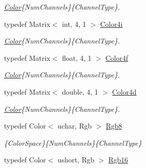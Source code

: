 \begin{DoxyCompactItemize}
\begin{DoxyCompactList}\small\item\em \hyperlink{class_d_o_1_1_color}{Color}\{Num\-Channels\}\{Channel\-Type\}. \end{DoxyCompactList}\item 
\hypertarget{group___color_types_gaaee572369f52480acc39975b3edb55e9}{typedef Matrix$<$ int, 4, 1 $>$ \hyperlink{group___color_types_gaaee572369f52480acc39975b3edb55e9}{Color4i}}\label{group___color_types_gaaee572369f52480acc39975b3edb55e9}

\begin{DoxyCompactList}\small\item\em \hyperlink{class_d_o_1_1_color}{Color}\{Num\-Channels\}\{Channel\-Type\}. \end{DoxyCompactList}\item 
\hypertarget{group___color_types_gaabb5f7b4107bd60e746943a8ca73355b}{typedef Matrix$<$ float, 4, 1 $>$ \hyperlink{group___color_types_gaabb5f7b4107bd60e746943a8ca73355b}{Color4f}}\label{group___color_types_gaabb5f7b4107bd60e746943a8ca73355b}

\begin{DoxyCompactList}\small\item\em \hyperlink{class_d_o_1_1_color}{Color}\{Num\-Channels\}\{Channel\-Type\}. \end{DoxyCompactList}\item 
\hypertarget{group___color_types_gad40abe643d03e7a5f11bb292b8c21178}{typedef Matrix$<$ double, 4, 1 $>$ \hyperlink{group___color_types_gad40abe643d03e7a5f11bb292b8c21178}{Color4d}}\label{group___color_types_gad40abe643d03e7a5f11bb292b8c21178}

\begin{DoxyCompactList}\small\item\em \hyperlink{class_d_o_1_1_color}{Color}\{Num\-Channels\}\{Channel\-Type\}. \end{DoxyCompactList}\item 
\hypertarget{group___color_types_gabba376766e70e08cdaccf69fa903f526}{typedef Color$<$ uchar, Rgb $>$ \hyperlink{group___color_types_gabba376766e70e08cdaccf69fa903f526}{Rgb8}}\label{group___color_types_gabba376766e70e08cdaccf69fa903f526}

\begin{DoxyCompactList}\small\item\em \{Color\-Space\}\{Num\-Channels\}\{Channel\-Type\} \end{DoxyCompactList}\item 
\hypertarget{group___color_types_ga6328b784c68d8b874b0b11d685d55315}{typedef Color$<$ ushort, Rgb $>$ \hyperlink{group___color_types_ga6328b784c68d8b874b0b11d685d55315}{Rgb16}}\label{group___color_types_ga6328b784c68d8b874b0b11d685d55315}


\end{DoxyCompactItemize}
